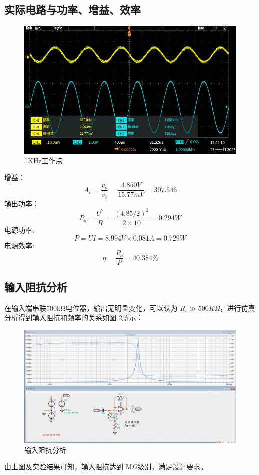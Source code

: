 \documentclass[a4paper]{article}
\theoremstyle{definition}
\theoremstyle{plain}
\theoremstyle{remark}
\newcommand{\reffig}[1]{图 \ref{#1}}
\begin{document}
\subsection{实际电路与功率、增益、效率}
\begin{figure}[H]
	\centering
	\includegraphics[width=1\textwidth]{1KHz工作点.PNG}
	\caption{1KHz工作点}
	\label{1KHz工作点}
\end{figure}
\noindent 增益：
\begin{equation}
	A_v = \frac{v_o}{v_i} = \frac{4.850V}{15.77mV} = 307.546
\end{equation}
输出功率：
\begin{equation}
	P_o = \frac{U^2}{R} = \frac{(4.85/2)^2}{2\times 10} = 0.294W
\end{equation}
电源功率:
\begin{equation}
	P = UI = 8.994V \times 0.081A = 0.729W
\end{equation}
电源效率:
\begin{equation}
	\eta = \frac{P_o}{P} = 40.384\%
\end{equation}
\newpage
\subsection{输入阻抗分析}
在输入端串联500kΩ电位器，输出无明显变化，可以认为 $R_i \gg 500K\Omega$，进行仿真分析得到输入阻抗和频率的关系如\reffig{输入阻抗分析}所示：
\begin{figure}[H]
	\centering
	\includegraphics[width=1\textwidth]{输入阻抗分析}
	\caption{输入阻抗分析}
	\label{输入阻抗分析}
\end{figure}
由上图及实验结果可知，输入阻抗达到 $\mathrm{M}\Omega$级别，满足设计要求。
\end{document}
